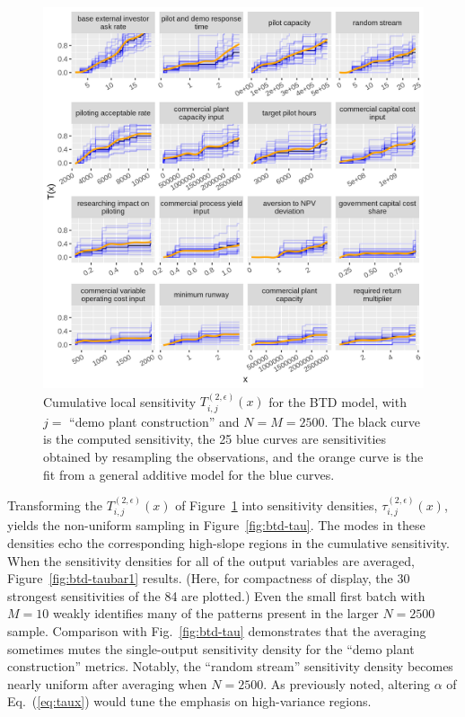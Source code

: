 \documentclass[12pt]{article}
\begin{document}
\begin{figure}
    \centering
    \includegraphics[width=\linewidth]{figures/btd-t.png}
    \caption{Cumulative local sensitivity $T_{i,j}^{(2,\epsilon)}(x)$ for the BTD model, with $j =$ ``demo plant construction'' and $N = M = 2500$. The black curve is the computed sensitivity, the 25 blue curves are sensitivities obtained by resampling the observations, and the orange curve is the fit from a general additive model for the blue curves.}
    \label{fig:btd-t}
\end{figure}

Transforming the $T_{i,j}^{(2,\epsilon)}(x)$ of Figure~\ref{fig:btd-t} into sensitivity densities, $\tau_{i,j}^{(2,\epsilon)}(x)$, yields the non-uniform sampling in Figure~\ref{fig:btd-tau}. The modes in these densities echo the corresponding high-slope regions in the cumulative sensitivity. When the sensitivity densities for all of the output variables are averaged, Figure~\ref{fig:btd-taubar1} results. (Here, for compactness of display, the 30 strongest sensitivities of the 84 are plotted.) Even the small first batch with $M = 10$ weakly identifies many of the patterns present in the larger $N = 2500$ sample. Comparison with Fig.~\ref{fig:btd-tau} demonstrates that the averaging sometimes mutes the single-output sensitivity density for the ``demo plant construction'' metrics. Notably, the ``random stream'' sensitivity density becomes nearly uniform after averaging when $N = 2500$. As previously noted, altering $\alpha$ of Eq.~(\ref{eq:taux}) would tune the emphasis on high-variance regions.
\end{document}
